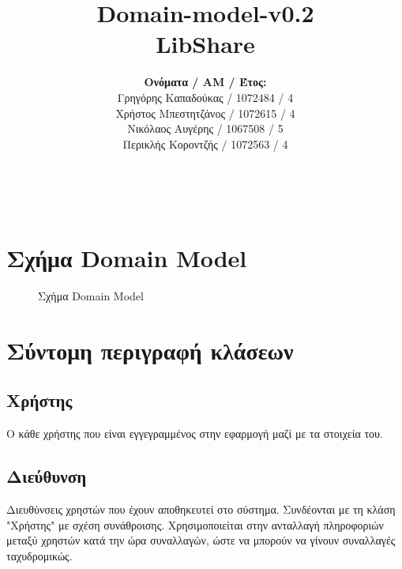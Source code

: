 \documentclass[12pt,a4paper]{article}
\title{Domain-model-v0.2 \\ LibShare}
\author{\textbf{Ονόματα / ΑΜ / Έτος:} \\ Γρηγόρης Καπαδούκας / 1072484 / 4\textdegree \\ Χρήστος Μπεστητζάνος / 1072615 / 4\textdegree \\ Νικόλαος Αυγέρης / 1067508 / 5\textdegree \\ Περικλής Κοροντζής / 1072563 / 4\textdegree}
\begin{document}
\makeatletter
\begin{center}
	\LARGE{\@title} \\
	\pagebreak
    \begin{LARGE}\@author\end{LARGE} 
    \pagebreak
\end{center}

\section{Σχήμα Domain Model}

\begin{figure}[H]
	\caption{Σχήμα Domain Model}
	\label{Σχήμα Domain Model}
\end{figure}

\section{Σύντομη περιγραφή κλάσεων}

\subsection{Χρήστης}
Ο κάθε χρήστης που είναι εγγεγραμμένος στην εφαρμογή μαζί με τα στοιχεία του. 

\subsection{Διεύθυνση}
Διευθύνσεις χρηστών που έχουν αποθηκευτεί στο σύστημα. Συνδέονται με τη κλάση "Χρήστης" με σχέση συνάθροισης. Χρησιμοποιείται στην ανταλλαγή πληροφοριών μεταξύ χρηστών κατά την ώρα συναλλαγών, ώστε να μπορούν να γίνουν συναλλαγές ταχυδρομικώς.
\end{document}
